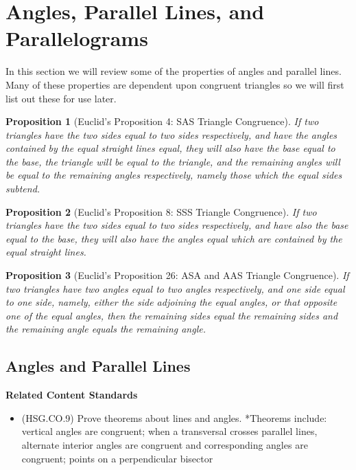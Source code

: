 \documentclass[
]{book}
\providecommand{\tightlist}{%
  \setlength{\itemsep}{0pt}\setlength{\parskip}{0pt}}
\newenvironment{standards}{}{}
\let\stdsection\section
\renewcommand\section{\newpage\stdsection}
\newtheorem{proposition}{Proposition}[chapter]
\theoremstyle{definition}
\theoremstyle{definition}
\theoremstyle{definition}
\theoremstyle{definition}
\theoremstyle{remark}
\begin{document}
\hypertarget{angles-parallel-lines-and-parallelograms}{%
\section{Angles, Parallel Lines, and Parallelograms}\label{angles-parallel-lines-and-parallelograms}}

In this section we will review some of the properties of angles and parallel lines. Many of these properties are dependent upon congruent triangles so we will first list out these for use later.

\begin{proposition}[Euclid's Proposition 4: SAS Triangle Congruence]
If two triangles have the two sides equal to two sides respectively, and have the angles contained by the equal straight lines equal, they will also have the base equal to the base, the triangle will be equal to the triangle, and the remaining angles will be equal to the remaining angles respectively, namely those which the equal sides subtend.
\end{proposition}

\begin{proposition}[Euclid's Proposition 8: SSS Triangle Congruence]
If two triangles have the two sides equal to two sides respectively, and have also the base equal to the base, they will also have the angles equal which are contained by the equal straight lines.
\end{proposition}

\begin{proposition}[Euclid's Proposition 26: ASA and AAS Triangle Congruence]
\protect\hypertarget{prp:prop26}{}\label{prp:prop26}If two triangles have two angles equal to two angles respectively, and one side equal to one side, namely, either the side adjoining the equal angles, or that opposite one of the equal angles, then the remaining sides equal the remaining sides and the remaining angle equals the remaining angle.
\end{proposition}

\hypertarget{angles-and-parallel-lines}{%
\subsection{Angles and Parallel Lines}\label{angles-and-parallel-lines}}

\begin{standards}

\begin{center}
\textbf{Related Content Standards}

\end{center}

\begin{itemize}
\tightlist
\item
  (HSG.CO.9) Prove theorems about lines and angles. *Theorems include: vertical angles are congruent; when a transversal crosses parallel lines, alternate interior angles are congruent and corresponding angles are congruent; points on a perpendicular bisector
\end{itemize}

\end{standards}
\end{document}
